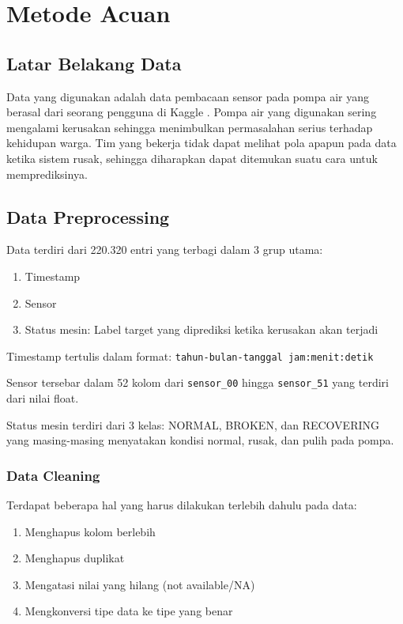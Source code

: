 \chapter{Metode Acuan}

\section{Latar Belakang Data}

Data yang digunakan adalah data pembacaan sensor pada pompa air yang berasal dari seorang pengguna di Kaggle \cite{pump_sensor_data}. Pompa air yang digunakan sering mengalami kerusakan sehingga menimbulkan permasalahan serius terhadap kehidupan warga. Tim yang bekerja tidak dapat melihat pola apapun pada data ketika sistem rusak, sehingga diharapkan dapat ditemukan suatu cara untuk memprediksinya.

\section{Data Preprocessing}

Data terdiri dari 220.320 entri yang terbagi dalam 3 grup utama:

\begin{enumerate}
    \item Timestamp
    \item Sensor
    \item Status mesin: Label target yang diprediksi ketika kerusakan akan terjadi
\end{enumerate}

Timestamp tertulis dalam format: \texttt{tahun-bulan-tanggal jam:menit:detik}

Sensor tersebar dalam 52 kolom dari \texttt{sensor\_00} hingga \texttt{sensor\_51} yang terdiri dari nilai float.

Status mesin terdiri dari 3 kelas: NORMAL, BROKEN, dan RECOVERING yang masing-masing menyatakan kondisi normal, rusak, dan pulih pada pompa.

    \subsection{Data Cleaning}

    Terdapat beberapa hal yang harus dilakukan terlebih dahulu pada data:

    \begin{enumerate}
        \item Menghapus kolom berlebih
        \item Menghapus duplikat
        \item Mengatasi nilai yang hilang (not available/NA)
        \item Mengkonversi tipe data ke tipe yang benar
    \end{enumerate}
    

